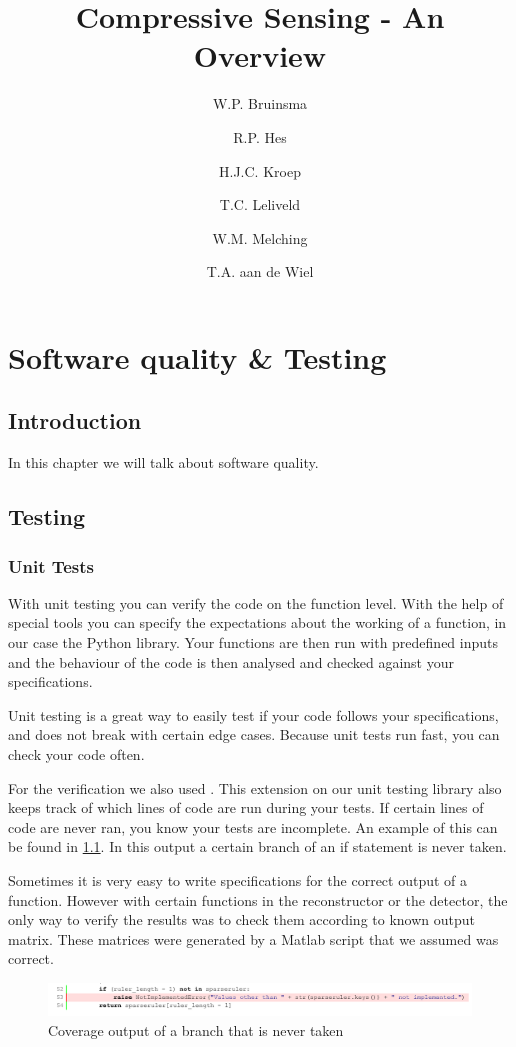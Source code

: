 \documentclass[a4paper, openany, oneside]{memoir}
\title{Compressive Sensing - An Overview}
\author{W.P. Bruinsma \and R.P. Hes \and H.J.C. Kroep \and T.C. Leliveld \and W.M. Melching \and T.A. aan de Wiel}
\begin{document}
\chapter{Software quality \& Testing}
\section{Introduction}
In this chapter we will talk about software quality.

\section{Testing}
\subsection{Unit Tests}
With unit testing you can verify the code on the function level. With the help of special tools you can specify the expectations about the working of a function, in our case the Python  library. Your functions are then run with predefined inputs and the behaviour of the code is then analysed and checked against your specifications.

Unit testing is a great way to easily test if your code follows your specifications, and does not break with certain edge cases. Because unit tests run fast, you can check your code often.

For the verification we also used . This extension on our unit testing library also keeps track of which lines of code are run during your tests. If certain lines of code are never ran, you know your tests are incomplete. An example of this can be found in \cref{fig:coverage_branch}. In this output a certain branch of an if statement is never taken.

Sometimes it is very easy to write specifications for the correct output of a function. However with certain functions in the reconstructor or the detector, the only way to verify the results was to check them according to known output matrix. These matrices were generated by a Matlab script that we assumed was correct.

\begin{figure}[h]
    \centering
    \includegraphics[width=\textwidth]{fig_branch_coverage.pdf}
    \caption{Coverage output of a branch that is never taken}
    \label{fig:coverage_branch}
\end{figure}
\end{document}
